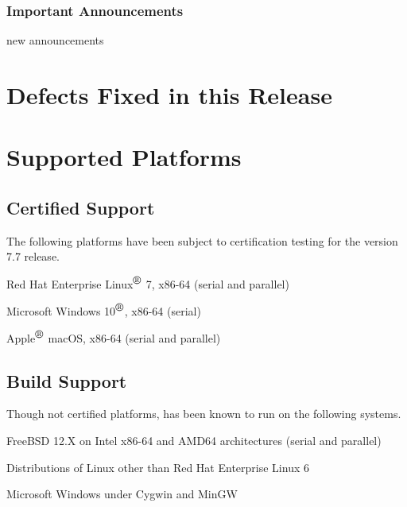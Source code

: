 \documentclass[letterpaper]{scrartcl}
\begin{document}
\subsubsection*{Important Announcements}
\begin{XyceItemize}
\item new announcements 
\end{XyceItemize}

\newpage
\section{Defects Fixed in this Release}


\newpage
\section{Supported Platforms}
\subsection*{Certified Support}
The following platforms have been subject to certification testing for the
\Xyce{} version 7.7 release.
\begin{XyceItemize}
  \item Red Hat Enterprise Linux${}^{\mbox{\textregistered}}$ 7, x86-64 (serial and parallel)
  \item Microsoft Windows 10${}^{\mbox{\textregistered}}$, x86-64 (serial)
  \item Apple${}^{\mbox{\textregistered}}$ macOS, x86-64 (serial and parallel)
\end{XyceItemize}


\subsection*{Build Support}
Though not certified platforms, \Xyce{} has been known to run on the following
systems.
\begin{XyceItemize}
  \item FreeBSD 12.X on Intel x86-64 and AMD64 architectures (serial
    and parallel)
  \item Distributions of Linux other than Red Hat Enterprise Linux 6
  \item Microsoft Windows under Cygwin and MinGW
\end{XyceItemize}
\end{document}
